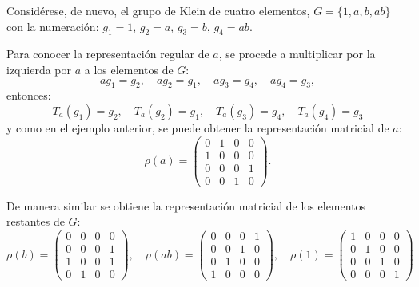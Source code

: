 \begin{ejemplo}
Considérese, de nuevo, el grupo de Klein de cuatro elementos, $G = \{ 1, a, b, ab\}$ con la numeración: $g_1 = 1$, $g_2 = a$, $g_3 = b$, $g_4 = ab$.

Para conocer la representación regular de $a$, se procede a multiplicar por  la izquierda por $a$ a los elementos de $G$:
\begin{equation*} ag_1 = g_2, \quad ag_2 = g_1, \quad ag_3 = g_4, \quad ag_4 = g_3, \end{equation*} entonces: 
\begin{equation*} T_a(g_1) = g_2 , \quad T_a(g_2) = g_1, \quad T_a(g_3) = g_4, \quad T_a(g_4) = g_3 \end{equation*} \nopagebreak[0] y como en el ejemplo anterior, se puede obtener la representación matricial de $a$:
\begin{equation*}  \rho(a) = \begin{pmatrix}
0 & 1 & 0 & 0 \\
1 & 0 & 0 & 0 \\
0 & 0 & 0 & 1 \\
0 & 0 & 1 & 0
\end{pmatrix} .\end{equation*}

De manera similar se obtiene la representación matricial de los elementos restantes de $G$:
\begin{equation*} \rho(b) = \begin{pmatrix}
0 & 0 & 0 & 0\\
0 & 0 & 0 & 1\\
1 & 0 & 0 & 1\\
0 & 1 & 0 & 0
\end{pmatrix}, \quad \rho(ab) = \begin{pmatrix}
0 & 0 & 0 & 1\\
0 & 0 & 1 & 0\\
0 & 1 & 0 & 0\\
1 & 0 & 0 & 0
\end{pmatrix} , \quad \rho(1) = \begin{pmatrix}
1 & 0 & 0 & 0\\
0 & 1 & 0 & 0 \\
0 & 0 & 1 & 0\\
0 & 0 & 0 & 1
\end{pmatrix} \end{equation*}

\end{ejemplo}

